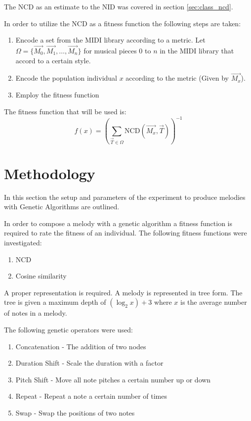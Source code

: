 The \ac{NCD} as an estimate to the \ac{NID} was covered in section \ref{sec:class_ncd}.

In order to utilize the \ac{NCD} as a fitness function the following steps are taken:
\begin{enumerate}
\item Encode a set from the \ac{MIDI} library according to a metric. Let $\Omega = \{\vec{M_0}, \vec{M_1}, \ldots, \vec{M_n}\}$ for musical pieces $0$ to $n$ in the \ac{MIDI} library that accord to a certain style.
\item Encode the population individual $x$ according to the metric (Given by $\vec{M_x}$).
\item Employ the fitness function
\end{enumerate}

The fitness function that will be used is:
\[f(x) =  \left(\sum_{\vec{T}\in\Omega} \text{NCD}(\vec{M_x}, \vec{T}) \right)^{-1}\]

\section{Methodology}
In this section the setup and parameters of the experiment to produce melodies with Genetic Algorithms are outlined.

In order to compose a melody with a genetic algorithm a fitness function is required to rate the fitness of an individual. The following fitness functions were investigated:
\begin{enumerate}
\item \ac{NCD}
\item Cosine similarity
\end{enumerate}

A proper representation is required. A melody is represented in tree form. The tree is given a maximum depth of $(\log_2 x) +  3$ where $x$ is the average number of notes in a melody.

The following genetic operators were used:
\begin{enumerate}
\item Concatenation - The addition of two nodes
\item Duration Shift - Scale the duration with a factor
\item Pitch Shift - Move all note pitches a certain number up or down
\item Repeat - Repeat a note a certain number of times
\item Swap - Swap the positions of two notes
\end{enumerate}

